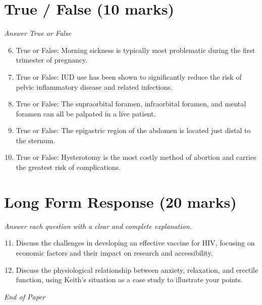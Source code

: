 \documentclass[12pt]{article}
\begin{document}
\section*{True / False (10 marks)}
\textit{Answer True or False}
\begin{enumerate}[label=\arabic*.]
\setcounter{enumi}{5}
\item True or False: Morning sickness is typically most problematic during the first trimester of pregnancy.
\item True or False: IUD use has been shown to significantly reduce the risk of pelvic inflammatory disease and related infections.
\item True or False: The supraorbital foramen, infraorbital foramen, and mental foramen can all be palpated in a live patient.
\item True or False: The epigastric region of the abdomen is located just distal to the sternum.
\item True or False: Hysterotomy is the most costly method of abortion and carries the greatest risk of complications.
\end{enumerate}

\section*{Long Form Response (20 marks)}
\textit{Answer each question with a clear and complete explanation.}
\begin{enumerate}[label=\arabic*.]
\setcounter{enumi}{10}
\item Discuss the challenges in developing an effective vaccine for HIV, focusing on economic factors and their impact on research and accessibility.
\item Discuss the physiological relationship between anxiety, relaxation, and erectile function, using Keith's situation as a case study to illustrate your points.
\end{enumerate}

\vfill
\noindent\textit{End of Paper}
\end{document}
